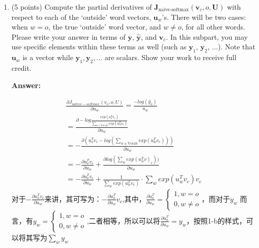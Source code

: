 \documentclass{article}
\newenvironment{answer}{
    {\bf Answer:} \sf \begingroup \color{red}%
}{\par\endgroup}%
\begin{document}
\begin{enumerate}[label=(\alph*)]
\textbf{Hint:} Consider the case where $\mathbf{u}_x = \alpha\mathbf{u}_y$ for some words $x \neq y$ and some scalar $\alpha$. Give examples of words $x$ and $y$ which satisfy the given relation and why would they be affected/not affected due to the normalization?

\begin{shaded}
\begin{answer}
L2 正则化保留了向量的方向信息，但是丢失了向量的大小信息。

如题中所描述的若单词x是good，y是better，向量的长度可能影响着词向量的描述“good”的程度，此时就不适宜使用L2正则化

而如果单词x是good，y是bad，两个向量的长度并不重要，而其代表的“good”的方向相反，此时就适宜使用L2正则化。
\end{answer}
\end{shaded}

\item (5 points) Compute the partial derivatives of $\bm J_{\text{naive-softmax}}(\bm v_c, o, \bm U)$ with respect to each of the `outside' word vectors, $\bm u_w$'s. There will be two cases: when $w=o$, the true `outside' word vector, and $w \neq o$, for all other words. Please write your answer in terms of $\bm y$, $\hat{\bm y}$, and $\bm v_c$. In this subpart, you may use specific elements within these terms as well (such as $\bm y_1$, $\bm y_2$, $\dots$). Note that $\bm u_w$ is a vector while $\bm y_1, \bm y_2, \dots$ are scalars. Show your work to receive full credit.

\begin{shaded}
\begin{answer}
\begin{equation}
\begin{array}{l}
		\frac{\partial J_{native-softmax}(v_c,o,U)}{\partial u_w} = \frac{-log(\hat{y}_o)}{u_w} \\
		=\frac{\partial -log \frac{exp(u_o^T v_c)}{\sum_{w\in \text{Vocab}}exp(u_w^T v_c)}}{\partial u_w} \\
		= -\frac{\partial (u_o^T v_c - log(\sum_{w\in \text{Vocab}}	exp(u_w^T v_c)))}{\partial u_w} \\
		= -\frac{\partial u_o^T v_c}{\partial u_w} +\frac{\partial log(\sum_w exp(u_w^Tv)_c	))}{\partial u_w} \\
		= -\frac{\partial u_o^T v_c}{\partial u_w} +\frac{1}{\sum_w exp(u_w^T v_c)} \cdot \sum_w exp(u_w^T v_c) v_c
\end{array}
\end{equation}
对于$-\frac{\partial u_o^T v_c}{\partial u_w}$来讲，其可写为：$-\frac{\partial u_o^T}{\partial u_w} v_c$,其中，$\frac{\partial u_o^T}{\partial u_w} = \left\{\begin{array}{c}
	1 , w=o \\
	0 , w\neq o 
\end{array}\right.$，而对于$y_w$	而言，有$y_w = \left\{\begin{array}{c}
	1 , w=o \\
	0 , w\neq o 
\end{array}\right.$,二者相等，所以可以将$\frac{\partial u_o^T}{\partial u_w} = y_w$，按照1-b的样式，可以将其写为$\sum_w y_w$


\end{answer}
\end{shaded}
\end{enumerate}
\end{document}
